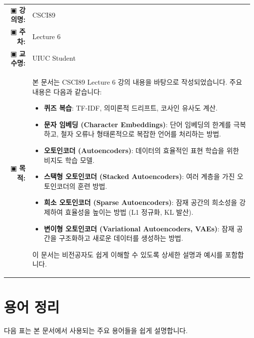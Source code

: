 \documentclass[11pt,a4paper]{article}
\makeatletter
\theoremstyle{definition}
\newcommand{\metainfo}[4]{
\begin{tcolorbox}[
    colback=lightpurple,
    colframe=darkpurple,
    boxrule=1pt,
    arc=2mm,
    left=10pt,
    right=10pt,
    top=8pt,
    bottom=8pt
]
\begin{tabular}{@{}rl@{}}
▣ \textbf{강의명:} & #1 \\[0.3em]
▣ \textbf{주차:} & #2 \\[0.3em]
▣ \textbf{교수명:} & #3 \\[0.3em]
▣ \textbf{목적:} & \begin{minipage}[t]{0.75\textwidth}#4\end{minipage}
\end{tabular}
\end{tcolorbox}
}
\makeatother
\begin{document}
\thispagestyle{firstpage}

\metainfo{CSCI89}{Lecture 6}{UIUC Student}{
본 문서는 CSCI89 Lecture 6 강의 내용을 바탕으로 작성되었습니다.
주요 내용은 다음과 같습니다:
\begin{itemize}
    \item \textbf{퀴즈 복습}: TF-IDF, 의미론적 드리프트, 코사인 유사도 계산.
    \item \textbf{문자 임베딩 (Character Embeddings)}: 단어 임베딩의 한계를 극복하고, 철자 오류나 형태론적으로 복잡한 언어를 처리하는 방법.
    \item \textbf{오토인코더 (Autoencoders)}: 데이터의 효율적인 표현 학습을 위한 비지도 학습 모델.
    \item \textbf{스택형 오토인코더 (Stacked Autoencoders)}: 여러 계층을 가진 오토인코더의 훈련 방법.
    \item \textbf{희소 오토인코더 (Sparse Autoencoders)}: 잠재 공간의 희소성을 강제하여 효율성을 높이는 방법 (L1 정규화, KL 발산).
    \item \textbf{변이형 오토인코더 (Variational Autoencoders, VAEs)}: 잠재 공간을 구조화하고 새로운 데이터를 생성하는 방법.
\end{itemize}
이 문서는 비전공자도 쉽게 이해할 수 있도록 상세한 설명과 예시를 포함합니다.
}

\tableofcontents

\newpage

\section{용어 정리}
다음 표는 본 문서에서 사용되는 주요 용어들을 쉽게 설명합니다.
\end{document}
